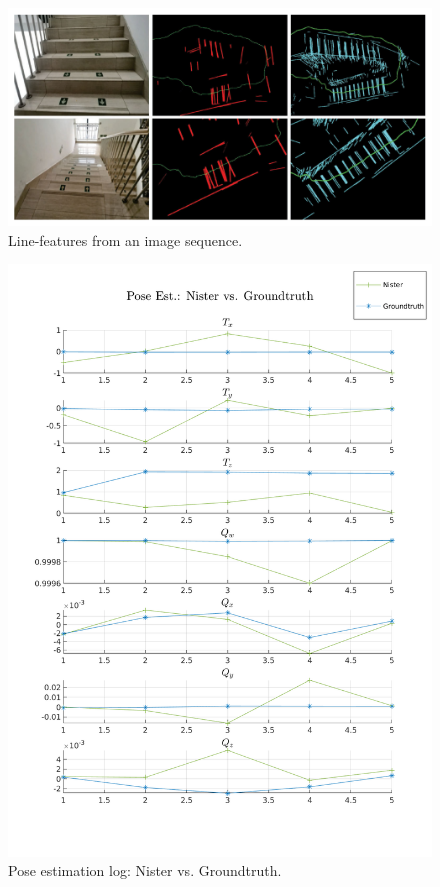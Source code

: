 \documentclass[11pt]{article}
\begin{document}
\begin{itemize}
    \begin{figure}[H]
      \begin{center}
        \includegraphics[width=.8\linewidth]{line_features.png}
      \end{center}
      \caption{Line-features from an image sequence.}
    \end{figure}

    \begin{figure}[H]
      \begin{center}
        \includegraphics[width=\linewidth]{plt_pos_log_Nister.png}
      \end{center}
      \caption{Pose estimation log: Nister vs. Groundtruth.}
    \end{figure}



\end{itemize}
\end{document}
